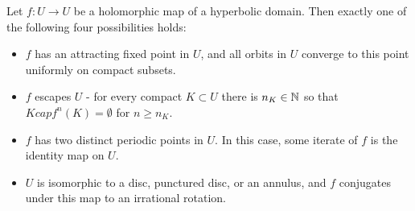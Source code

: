 \documentclass[10pt,a4paper]{article}
\begin{document}
\begin{theorem}
  Let $f:U \to U$ be a holomorphic map of a hyperbolic domain. Then exactly one of the following four possibilities holds:
  \begin{itemize}
    \item $f$ has an attracting fixed point in $U$, and all orbits in $U$ converge to this point uniformly on compact subsets.
    \item $f$ escapes $U$ - for every compact $K \subset U$ there is $n_K \in \mathbb{N}$ so that $K cap f^n(K) = \emptyset$ for $n \geq n_K$.
    \item $f$ has two distinct periodic points in $U$. In this case, some iterate of $f$ is the identity map on $U$.
    \item $U$ is isomorphic to a disc, punctured disc, or an annulus, and $f$ conjugates under this map to an irrational rotation.
  \end{itemize}
\end{theorem}
\end{document}
